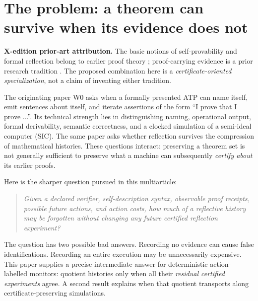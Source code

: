\documentclass[11pt,letterpaper]{article}
\newcommand{\PriorArtNote}[1]{%
\par\smallskip\noindent\begin{minipage}{\linewidth}\small\color{black!85}%
\textbf{X-edition prior-art attribution.} #1\end{minipage}\par\smallskip}
\begin{document}
\section{The problem: a theorem can survive when its evidence does not}
\PriorArtNote{The basic notions of self-provability and formal reflection belong to earlier proof theory \cite{godel,lob,feferman}; proof-carrying evidence is a prior research tradition \cite{necula,besson}. The proposed combination here is a \emph{certificate-oriented specialization}, not a claim of inventing either tradition.}
The originating paper W0 asks when a formally presented ATP can name itself, emit sentences about itself, and iterate assertions of the form ``I prove that I prove ...''. Its technical strength lies in distinguishing naming, operational output, formal derivability, semantic correctness, and a clocked simulation of a semi-ideal computer (SIC). The same paper asks whether reflection survives the compression of mathematical histories. These questions interact: preserving a theorem set is not generally sufficient to preserve what a machine can subsequently \emph{certify about} its earlier proofs.

Here is the sharper question pursued in this multiarticle:
\begin{quote}
\emph{Given a declared verifier, self-description syntax, observable proof receipts, possible future actions, and action costs, how much of a reflective history may be forgotten without changing any future certified reflection experiment?}
\end{quote}
The question has two possible bad answers. Recording no evidence can cause false identifications. Recording an entire execution may be unnecessarily expensive. This paper supplies a precise intermediate answer for deterministic action-labelled monitors: quotient histories only when all their \emph{residual certified experiments} agree. A second result explains when that quotient transports along certificate-preserving simulations.
\end{document}
